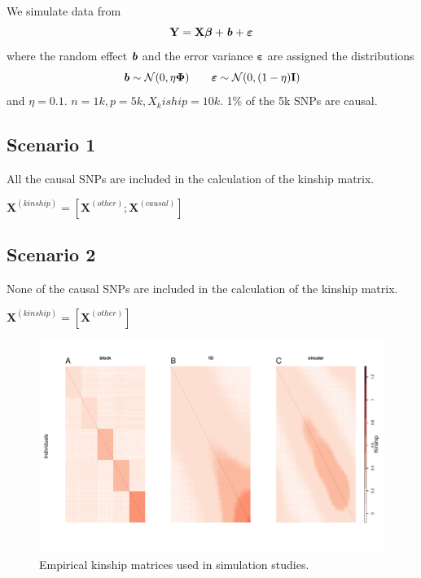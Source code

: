 \documentclass[12pt,letter]{article}\usepackage[]{graphicx}\usepackage[]{color}
\newenvironment{knitrout}{}{} %
\newcommand{\bX}{\textbf{X}}
\newcommand{\bY}{\textbf{Y}}
\newcommand{\bb}{\textbf{\emph{b}}}
\newcommand{\bI}{\textbf{I}}
\newcommand{\be}{\boldsymbol{\varepsilon}}
\newcommand{\bbeta}{\boldsymbol{\beta}}
\newcommand{\bPhi}{\boldsymbol{\Phi}}
\begin{document}
We simulate data from \begin{equation}
	\bY = \bX \bbeta + \bb + \be
\end{equation}
where the random effect $\bb$ and the error variance $\be$ are assigned the distributions
\begin{equation}
	\bb \sim \mathcal{N}(0, \eta \bPhi) \qquad \be \sim \mathcal{N}(0, (1-\eta) \bI)
\end{equation}
and $\eta=0.1$. $n=1k, p = 5k, X_kiship = 10k$. 1\% of the 5k SNPs are causal.


\subsection*{Scenario 1}
All the causal SNPs are included in the calculation of the kinship matrix.

$\bX^{(kinship)} = \left[\bX^{(other)} ; \bX^{(causal)}\right]$


\subsection*{Scenario 2}
None of the causal SNPs are included in the calculation of the kinship matrix.

$\bX^{(kinship)} = \left[\bX^{(other)} \right]$


\begin{knitrout}\scriptsize
{}\color{fgcolor}\begin{figure}[H]

{\centering \includegraphics[width=1\linewidth]{figure/plot-kinship-sim-1} 

}

\caption[Empirical kinship matrices used in simulation studies]{Empirical kinship matrices used in simulation studies.}\label{fig:plot-kinship-sim}
\end{figure}


\end{knitrout}
\end{document}

